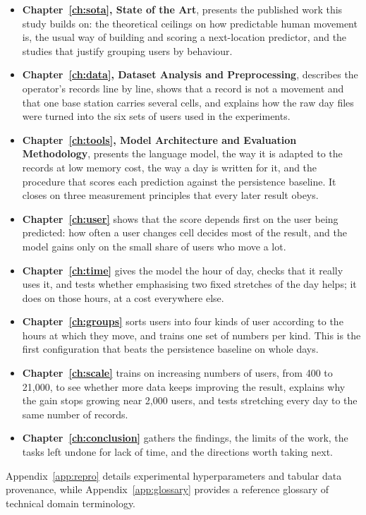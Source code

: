 \begin{itemize}
  \item \textbf{Chapter~\ref{ch:sota}, State of the Art}, presents the published work this study builds on: the theoretical ceilings on how predictable human movement is, the usual way of building and scoring a next-location predictor, and the studies that justify grouping users by behaviour.
  \item \textbf{Chapter~\ref{ch:data}, Dataset Analysis and Preprocessing}, describes the operator's records line by line, shows that a record is not a movement and that one base station carries several cells, and explains how the raw day files were turned into the six sets of users used in the experiments.
  \item \textbf{Chapter~\ref{ch:tools}, Model Architecture and Evaluation Methodology}, presents the language model, the way it is adapted to the records at low memory cost, the way a day is written for it, and the procedure that scores each prediction against the persistence baseline. It closes on three measurement principles that every later result obeys.
  \item \textbf{Chapter~\ref{ch:user}} shows that the score depends first on the user being predicted: how often a user changes cell decides most of the result, and the model gains only on the small share of users who move a lot.
  \item \textbf{Chapter~\ref{ch:time}} gives the model the hour of day, checks that it really uses it, and tests whether emphasising two fixed stretches of the day helps; it does on those hours, at a cost everywhere else.
  \item \textbf{Chapter~\ref{ch:groups}} sorts users into four kinds of user according to the hours at which they move, and trains one set of numbers per kind. This is the first configuration that beats the persistence baseline on whole days.
  \item \textbf{Chapter~\ref{ch:scale}} trains on increasing numbers of users, from 400 to 21{,}000, to see whether more data keeps improving the result, explains why the gain stops growing near 2{,}000 users, and tests stretching every day to the same number of records.
  \item \textbf{Chapter~\ref{ch:conclusion}} gathers the findings, the limits of the work, the tasks left undone for lack of time, and the directions worth taking next.
\end{itemize}

Appendix~\ref{app:repro} details experimental hyperparameters and tabular data provenance, while Appendix~\ref{app:glossary} provides a reference glossary of technical domain terminology.
